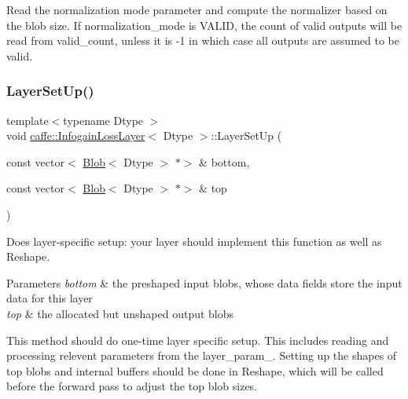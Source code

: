 Read the normalization mode parameter and compute the normalizer based on the blob size. If normalization\+\_\+mode is V\+A\+L\+ID, the count of valid outputs will be read from valid\+\_\+count, unless it is -\/1 in which case all outputs are assumed to be valid. \mbox{\label{classcaffe_1_1_infogain_loss_layer_a772be3f4074c72b3cf9214bda3422402}} 
\subsubsection{\texorpdfstring{Layer\+Set\+Up()}{LayerSetUp()}\hspace{0.1cm}{\footnotesize\ttfamily [1/2]}}
{\footnotesize\ttfamily template$<$typename Dtype $>$ \\
void \mbox{\hyperlink{classcaffe_1_1_infogain_loss_layer}{caffe\+::\+Infogain\+Loss\+Layer}}$<$ Dtype $>$\+::Layer\+Set\+Up (\begin{DoxyParamCaption}\item[{const vector$<$ \mbox{\hyperlink{classcaffe_1_1_blob}{Blob}}$<$ Dtype $>$ $\ast$$>$ \&}]{bottom,  }\item[{const vector$<$ \mbox{\hyperlink{classcaffe_1_1_blob}{Blob}}$<$ Dtype $>$ $\ast$$>$ \&}]{top }\end{DoxyParamCaption})\hspace{0.3cm}{\ttfamily [virtual]}}



Does layer-\/specific setup\+: your layer should implement this function as well as Reshape. 


\begin{DoxyParams}{Parameters}
{\em bottom} & the preshaped input blobs, whose data fields store the input data for this layer \\
\hline
{\em top} & the allocated but unshaped output blobs\\
\hline
\end{DoxyParams}
This method should do one-\/time layer specific setup. This includes reading and processing relevent parameters from the {\ttfamily layer\+\_\+param\+\_\+}. Setting up the shapes of top blobs and internal buffers should be done in {\ttfamily Reshape}, which will be called before the forward pass to adjust the top blob sizes. 

